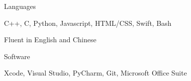 \vspace{-3mm}

\begin{cventries}
    \cventry
    {}
    {Languages}
    {} 
    {}
    {\begin{cvitems}
        \vspace*{-1mm}
        \item {C++, C, Python, Javascript, HTML/CSS, Swift, Bash}
        \item {Fluent in English and Chinese}
        \end{cvitems}
    }
    
    \cventry
    {}
    {Software} 
    {} 
    {}
    {\begin{cvitems}
        \vspace*{-4mm}
        \item {Xcode, Visual Studio, PyCharm, Git, Microsoft Office Suite}
    \end{cvitems}
    }
\end{cventries}